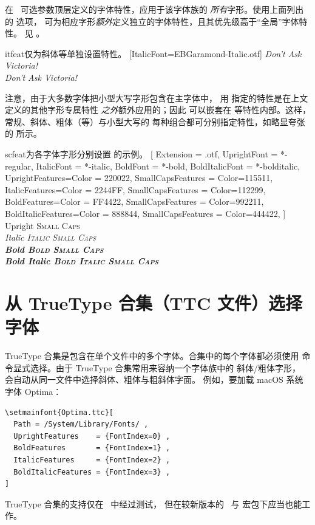 \documentclass[a4paper]{l3doc}
\begin{document}
在 \cmd\fontspec\ 可选参数顶层定义的字体特性，应用于该字体族的
\emph{所有}字形。使用上面列出的  选项，
可为相应字形\emph{额外}定义独立的字体特性，且其优先级高于“全局”字体特性。
见 。

\begin{Xexample}{itfeat}{仅为斜体等单独设置特性。}
%
  [ItalicFont=EBGaramond-Italic.otf]
\itshape Don’t Ask Victoria! \\
Don’t Ask Victoria! \\
\end{Xexample}

注意，由于大多数字体把小型大写字形包含在主字体中，
用  指定的特性是在上文定义的其他字形专属特性
\emph{之外}额外应用的；因此  可以嵌套在
 等特性内部。这样，常规、斜体、粗体（等）与小型大写的
每种组合都可分别指定特性，如略显夸张的  所示。

\begin{Xexample}{scfeat}{为各字体字形分别设置  的示例。}
  [
      Extension = {.otf},
      UprightFont = {*-regular}, ItalicFont = {*-italic},
      BoldFont = {*-bold}, BoldItalicFont = {*-bolditalic},
      UprightFeatures={Color = 220022,
           SmallCapsFeatures = {Color=115511}},
       ItalicFeatures={Color = 2244FF,
           SmallCapsFeatures = {Color=112299}},
         BoldFeatures={Color = FF4422,
           SmallCapsFeatures = {Color=992211}},
   BoldItalicFeatures={Color = 888844,
           SmallCapsFeatures = {Color=444422}},
           ]
  Upright {\scshape Small Caps}\\
  \itshape Italic {\scshape Italic Small Caps}\\
  \upshape\bfseries Bold {\scshape Bold Small Caps}\\
  \itshape Bold Italic {\scshape Bold Italic Small Caps}
\end{Xexample}


\section{从 TrueType 合集（TTC 文件）选择字体}
TrueType 合集是包含在单个文件中的多个字体。合集中的每个字体都必须使用
 命令显式选择。由于 TrueType 合集常用来容纳一个字体族中的
斜体/粗体字形， 会自动从同一文件中选择斜体、粗体与粗斜体字面。
例如，要加载 macOS 系统字体 Optima：
\begin{Verbatim}
\setmainfont{Optima.ttc}[
  Path = /System/Library/Fonts/ ,
  UprightFeatures    = {FontIndex=0} ,
  BoldFeatures       = {FontIndex=1} ,
  ItalicFeatures     = {FontIndex=2} ,
  BoldItalicFeatures = {FontIndex=3} ,
]
\end{Verbatim}
TrueType 合集的支持仅在 \XeTeX\ 中经过测试，
但在较新版本的 \LuaTeX\ 与  宏包下应当也能工作。
\end{document}
